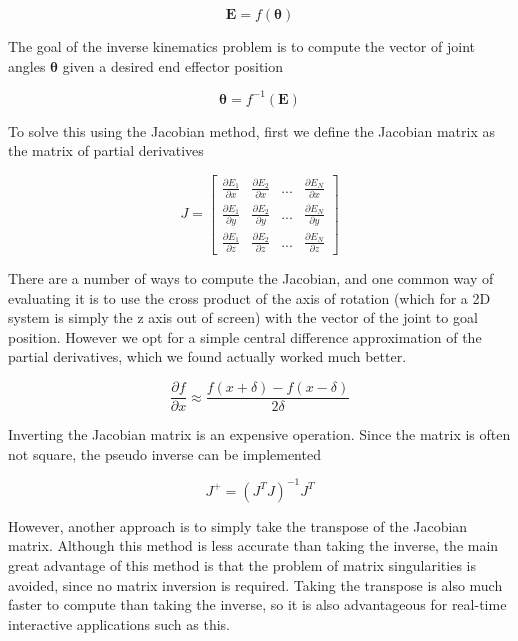 \documentclass[paper=a4, fontsize=11pt]{scrartcl} %
\numberwithin{equation}{section} %
\numberwithin{figure}{section} %
\numberwithin{table}{section} %
\newcommand{\vect}[1]{\mathbf{#1}}
\newcommand{\params}{\boldsymbol{\theta}}
\newcommand{\dn}[1]{\partial{#1}}
\begin{document}
\begin{equation}
\vect{E} = f(\params)
\end{equation}

The goal of the inverse kinematics problem is to compute the vector of joint angles $\params$ given a desired end effector position

\begin{equation}
\params = f^{-1}(\vect{E})
\end{equation}

To solve this using the Jacobian method, first we define the Jacobian matrix as the matrix of partial derivatives

\begin{equation}
J = \left[
\begin{array}{cccc}
\frac{\dn{E_1}}{\dn{x}} & \frac{\dn{E_2}}{\dn{x}} & ... & \frac{\dn{E_N}}{\dn{x}} 
\\[0.2cm]
\frac{\dn{E_1}}{\dn{y}} & \frac{\dn{E_2}}{\dn{y}} & ... & \frac{\dn{E_N}}{\dn{y}} 
\\[0.2cm]
\frac{\dn{E_1}}{\dn{z}} & \frac{\dn{E_2}}{\dn{z}} & ... & \frac{\dn{E_N}}{\dn{z}}
\end{array}
\right]
\end{equation}

There are a number of ways to compute the Jacobian, and one common way of evaluating it is to use the cross product of the axis of rotation (which for a 2D system is simply the z axis out of screen) with the vector of the joint to goal position. However we opt for a simple central difference approximation of the partial derivatives, which we found actually worked much better.

\begin{equation}
\frac{\dn{f}}{\dn{x}} \approx \frac{f(x+\delta) - f(x-\delta)}{2\delta} 
\end{equation}
 
Inverting the Jacobian matrix is an expensive operation. Since the matrix is often not square, the pseudo inverse can be implemented

\begin{equation}
J^+ = (J^TJ)^{-1}J^T
\end{equation}

However, another approach is to simply take the transpose of the Jacobian matrix. Although this method is less accurate than taking the inverse, the main great advantage of this method is that the problem of matrix singularities is avoided, since no matrix inversion is required. Taking the transpose is also much faster to compute than taking the inverse, so it is also advantageous for real-time interactive applications such as this. \\
\end{document}
